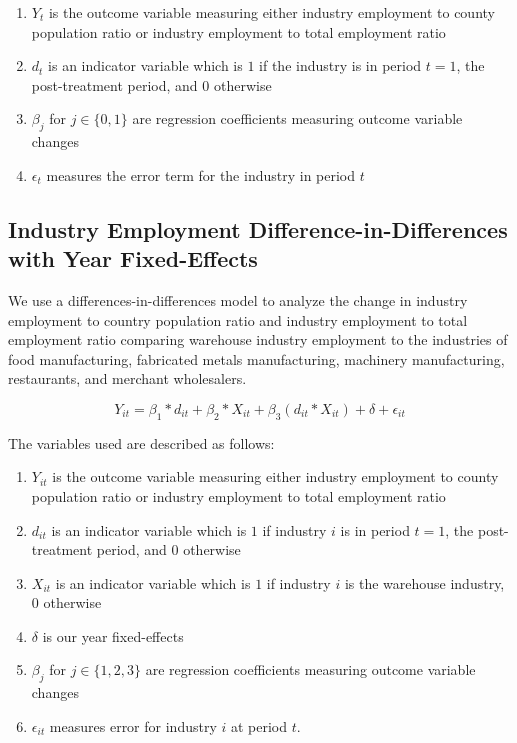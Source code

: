 \documentclass[11pt]{article}
\begin{document}
\begin{enumerate}
    \item $Y_{t}$ is the outcome variable measuring either industry employment to county population ratio or industry employment to total employment ratio
    \item $d_{t}$ is an indicator variable which is $1$ if the industry is in period $t = 1$, the post-treatment period, and  0 otherwise
    \item $\beta_j$ for $j\in \{0,1\}$ are regression coefficients measuring outcome variable changes 
    \item $\epsilon_{t}$ measures the error term for the industry in period $t$
\end{enumerate}

\subsection{Industry Employment Difference-in-Differences with Year Fixed-Effects}

\-\hspace{0.5cm} We use a differences-in-differences model to analyze the change in industry employment to country population ratio and industry employment to total employment ratio comparing warehouse industry employment to the industries of food manufacturing, fabricated metals manufacturing, machinery manufacturing, restaurants, and merchant wholesalers.

$$Y_{it} = \beta_1 *d_{it} + \beta_2*X_{it} + \beta_3(d_{it}*X_{it}) + \delta + \epsilon_{it}$$

The variables used are described as follows: 

\begin{enumerate}
    \item $Y_{it}$ is the outcome variable measuring either industry employment to county population ratio or industry employment to total employment ratio
    \item $d_{it}$ is an indicator variable which is $1$ if industry $i$ is in period $t = 1$, the post-treatment period, and  0 otherwise
    \item $X_{it}$ is an indicator variable which is $1$ if industry $i$ is the warehouse industry, 0 otherwise
    \item $\delta$ is our year fixed-effects
    \item $\beta_j$ for $j\in \{1,2,3\}$ are regression coefficients measuring outcome variable changes 
    \item $\epsilon_{it}$ measures error for industry $i$ at period $t$.
\end{enumerate}
\end{document}
